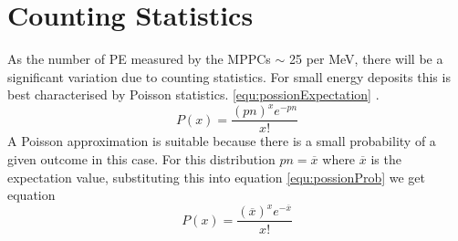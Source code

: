 
\section{Counting Statistics} \label{sec:GEANT4Simulation_countingStats}
As the number of PE measured by the MPPCs $\sim$ 25 per MeV, there will be a significant variation due to counting statistics. For small energy deposits this is best characterised by Poisson statistics.
\ref{equ:possionExpectation} \cite{knoll_2010}.
\begin{equation}
P(x) = \frac{(pn)^x e^{-pn}}{x!}  
\label{equ:possionProb}
\end{equation}
A Poisson approximation is suitable because there is a small probability of a given outcome in this case. For this distribution $pn = \overline{x}$ where $\overline{x}$ is the expectation value, substituting this into equation \ref{equ:possionProb} we get equation 
\begin{equation}
P(x) = \frac{(\overline{x})^x e^{-\overline{x}}}{x!}  
\label{equ:possionExpectation}
\end{equation}

